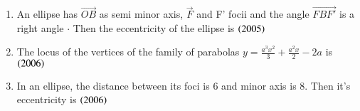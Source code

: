 \documentclass[journal,12pt,twocolumn]{IEEEtran}
\theoremstyle{remark}
\begin{document}
\begin{enumerate}
\begin{enumerate}[label=(\alph*)]
\end{enumerate}
\hfill
\item An ellipse has {$\vec{OB}$} as semi minor axis, {$\vec{F}$} and F' focii and the angle {$\vec{FBF'}$} is a right angle {$ \cdot $} Then the eccentricity of the ellipse is
\hfill
\hfill{{$ \left(2005\right) $}}
\begin{enumerate}[label=(\alph*)]
\end{enumerate}
\hfill
\item The locus of the vertices of the family of parabolas {$ y = \frac{a^3 x^2}{3} + \frac{a^2 x}{2} - 2a  $} is 
\hfill{{$ \left(2006\right) $}}
\begin{enumerate}[label=(\alph*)]	
\end{enumerate}
\hfill
\item In an ellipse, the distance between its foci is 6 and minor axis is 8. Then it's eccentricity is
\hfill
\hfill{{$ \left(2006\right) $}}
\begin{enumerate}[label=(\alph*)]
\end{enumerate}

\end{enumerate}
\end{document}
